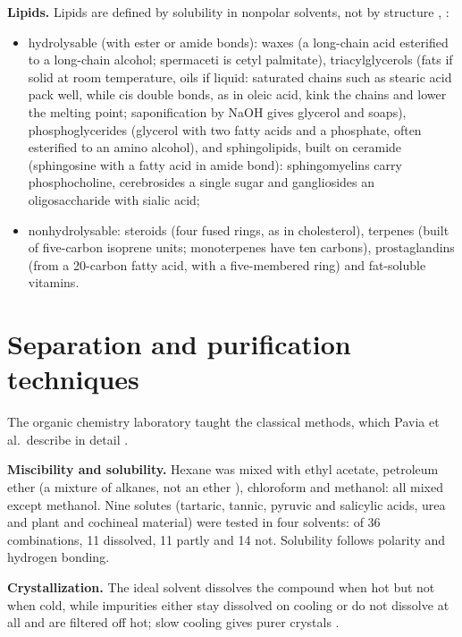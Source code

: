 \textbf{Lipids.}
Lipids are defined by solubility in nonpolar
solvents, not by structure \cite[Chapter
25]{wade2013organic}, \cite[Section
9-1]{voet2013fundamentals}:
\begin{itemize}
\item hydrolysable (with ester or amide
bonds): waxes (a long-chain acid esterified
to a long-chain alcohol; spermaceti is cetyl
palmitate), triacylglycerols (fats if solid
at room temperature, oils if liquid:
saturated chains such as stearic acid pack
well, while cis double bonds, as in oleic
acid, kink the chains and lower the melting
point; saponification by NaOH gives glycerol
and soaps), phosphoglycerides (glycerol with
two fatty acids and a phosphate, often
esterified to an amino alcohol), and
sphingolipids, built on ceramide (sphingosine
with a fatty acid in amide bond):
sphingomyelins carry phosphocholine,
cerebrosides a single sugar and gangliosides
an oligosaccharide with sialic acid;
\item nonhydrolysable: steroids (four fused
rings, as in cholesterol), terpenes (built of
five-carbon isoprene units; monoterpenes have
ten carbons), prostaglandins (from a
20-carbon fatty acid, with a five-membered
ring) and fat-soluble vitamins.
\end{itemize}

\section{Separation and purification
techniques}
\label{section-chem-lab-techniques}

The organic chemistry laboratory taught the
classical methods, which Pavia et al.\
describe in detail
\cite{pavia2002microscale}.

\textbf{Miscibility and solubility.}
Hexane was mixed with ethyl acetate,
petroleum ether (a mixture of alkanes, not an
ether \cite[Chapter
10]{pavia2002microscale}), chloroform and
methanol: all mixed except methanol. Nine
solutes (tartaric, tannic, pyruvic and
salicylic acids, urea and plant and cochineal
material) were tested in four solvents: of 36
combinations, 11 dissolved, 11 partly and 14
not. Solubility follows polarity and hydrogen
bonding.

\textbf{Crystallization.}
The ideal solvent dissolves the compound when
hot but not when cold, while impurities
either stay dissolved on cooling or do not
dissolve at all and are filtered off hot;
slow cooling gives purer crystals
\cite[Chapter 11]{pavia2002microscale}.

